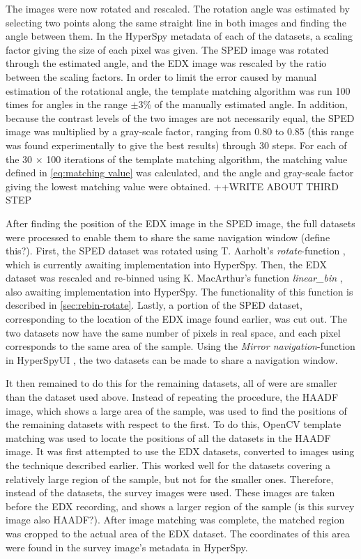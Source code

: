 The images were now rotated and rescaled. The rotation angle was estimated by selecting two points along the same straight line in both images and finding the angle between them. In the HyperSpy metadata of each of the datasets, a scaling factor giving the size of each pixel was given. The SPED image was rotated through the estimated angle, and the EDX image was rescaled by the ratio between the scaling factors. In order to limit the error caused by manual estimation of the rotational angle, the template matching algorithm was run 100 times for angles in the range $\pm3$\% of the manually estimated angle. In addition, because the contrast levels of the two images are not necessarily equal, the SPED image was multiplied by a gray-scale factor, ranging from 0.80 to 0.85 (this range was found experimentally to give the best results) through 30 steps. For each of the 30 $\times$ 100 iterations of the template matching algorithm, the matching value defined in \cref{eq:matching value} was calculated, and the angle and gray-scale factor giving the lowest matching value were obtained. ++WRITE ABOUT THIRD STEP

After finding the position of the EDX image in the SPED image, the full datasets were processed to enable them to share the same navigation window (define this?). First, the SPED dataset was rotated using T. Aarholt's \textit{rotate}-function \cite{aarholt-rotation}, which is currently awaiting implementation into HyperSpy. Then, the EDX dataset was rescaled and re-binned using K. MacArthur's function \textit{linear\_bin} \cite{kate-binning}, also awaiting implementation into HyperSpy. The functionality of this function is described in \cref{sec:rebin-rotate}. Lastly, a portion of the SPED dataset, corresponding to the location of the EDX image found earlier, was cut out. The two datasets now have the same number of pixels in real space, and each pixel corresponds to the same area of the sample. Using the \textit{Mirror navigation}-function in HyperSpyUI \cite{hyperspyUI}, the two datasets can be made to share a navigation window. 

It then remained to do this for the remaining datasets, all of were are smaller than the dataset used above. Instead of repeating the procedure, the HAADF image, which shows a large area of the sample, was used to find the positions of the remaining datasets with respect to the first. To do this, OpenCV template matching was used to locate the positions of all the datasets in the HAADF image. It was first attempted to use the EDX datasets, converted to images using the technique described earlier. This worked well for the datasets covering a relatively large region of the sample, but not for the smaller ones. Therefore, instead of the datasets, the survey images were used. These images are taken before the EDX recording, and shows a larger region of the sample (is this survey image also HAADF?). After image matching was complete, the matched region was cropped to the actual area of the EDX dataset. The coordinates of this area were found in the survey image's metadata in HyperSpy. 

